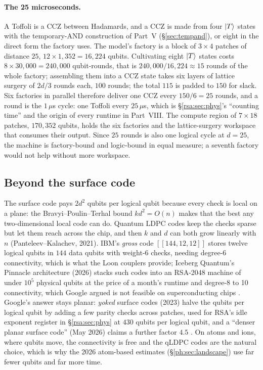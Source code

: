 \paragraph{The 25 microseconds.} A Toffoli is a CCZ between Hadamards, and a CCZ is made from
four $\lvert T \rangle$ states with the temporary-AND construction of Part~V (\S\ref{sec:tempand}), or
eight in the direct form the factory uses. The model's factory is a block of $3\times4$ patches
of distance $25$, $12\times1,352=16,224$ qubits. Cultivating eight $\lvert T \rangle$ states costs
$8\times30,000=240,000$ qubit-rounds, that is $240,000/16,224\approx15$ rounds of the whole
factory; assembling them into a CCZ state takes six layers of lattice surgery of $2d/3$ rounds
each, $100$ rounds; the total $115$ is padded to $150$ for slack. Six factories in parallel
therefore deliver one CCZ every $150/6=25$ rounds, and a round is the $1\,\mu$s cycle: one
Toffoli every $25\,\mu$s, which is \S\ref{rsa:sec:phys}'s ``counting time'' and the origin of
every runtime in Part~VIII. The compute region of $7\times18$ patches, $170,352$ qubits, holds
the six factories and the lattice-surgery workspace that consumes their output. Since $25$ rounds
is also one logical cycle at $d=25$, the machine is factory-bound and logic-bound in equal
measure; a seventh factory would not help without more workspace.

\subsection{Beyond the surface code}

The surface code pays $2d^2$ qubits per logical qubit because every check is local on a plane:
the Bravyi--Poulin--Terhal bound $kd^2=O(n)$ makes that the best any two-dimensional local code
can do. Quantum LDPC codes keep the checks sparse but let them reach across the chip, and then
$k$ and $d$ can both grow linearly with $n$ (Panteleev--Kalachev, 2021). IBM's \emph{gross} code
$[[144,12,12]]$ stores twelve logical qubits in $144$ data qubits with weight-6 checks, needing
degree-6 connectivity, which is what the Loon couplers provide; Iceberg Quantum's Pinnacle
architecture (2026) stacks such codes into an RSA-2048 machine of under $10^5$ physical qubits
at the price of a month's runtime and degree-8 to 10 connectivity, which Google argued is not
feasible on superconducting chips \cite{ph:pinnacle26,ph:uqt26}. Google's answer stays planar:
\emph{yoked} surface codes (2023) halve the qubits per logical qubit by adding a few parity
checks across patches, used for RSA's idle exponent register in \S\ref{rsa:sec:phys} at
$430$ qubits per logical qubit, and a ``denser planar surface code'' (May 2026) claims a further
factor $4.5$ \cite{ph:uqt26}. On atoms and ions, where qubits move, the connectivity is free
and the qLDPC codes are the natural choice, which is why the 2026 atom-based estimates
(\S\ref{ph:sec:landscape}) use far fewer qubits and far more time.

